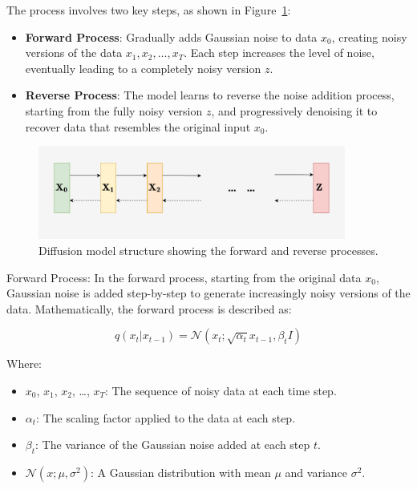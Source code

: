 The process involves two key steps, as shown in Figure~\ref{fig:Diffusion_structure}:
\begin{itemize}
  \item \textbf{Forward Process}: Gradually adds Gaussian noise to data \(x_0\), creating noisy versions of the data \(x_1, x_2, \dots, x_T\). Each step increases the level of noise, eventually leading to a completely noisy version \(z\).
  \item \textbf{Reverse Process}: The model learns to reverse the noise addition process, starting from the fully noisy version \(z\), and progressively denoising it to recover data that resembles the original input \(x_0\).
\end{itemize}

\begin{figure}[h]
    \centering
    \includegraphics[width=0.9\textwidth]{./Images/Disffusion_structure.jpg}
    \caption{Diffusion model structure showing the forward and reverse processes.}
    \label{fig:Diffusion_structure}
\end{figure}

Forward Process:
In the forward process, starting from the original data \(x_0\), Gaussian noise is added step-by-step to generate increasingly noisy versions of the data. Mathematically, the forward process is described as:

\begin{equation}
q(x_t | x_{t-1}) = \mathcal{N}(x_t; \sqrt{\alpha_t} x_{t-1}, \beta_t I)
\end{equation}

Where:
\begin{itemize}
    \item \(x_0\), \(x_1\), \(x_2\), \dots, \(x_T\): The sequence of noisy data at each time step.
    \item \(\alpha_t\): The scaling factor applied to the data at each step.
    \item \(\beta_t\): The variance of the Gaussian noise added at each step \(t\).
    \item \(\mathcal{N}(x; \mu, \sigma^2)\): A Gaussian distribution with mean \(\mu\) and variance \(\sigma^2\).
\end{itemize}


